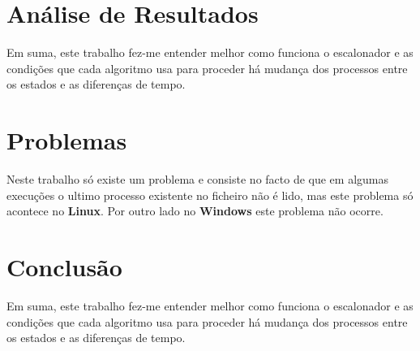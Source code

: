 \documentclass[11pt]{article}   %
\begin{document}
\section{Análise de Resultados} %
Em suma, este trabalho fez-me entender melhor como funciona o escalonador e as condições que cada algoritmo usa para proceder há mudança dos processos entre os estados e as diferenças de tempo. 

\section{Problemas}
\hspace{0,5cm}Neste trabalho só existe um problema e consiste no facto de que em algumas execuções o ultimo processo existente no ficheiro não é lido, mas este problema só acontece no \textbf{Linux}. Por outro lado no \textbf{Windows} este problema não ocorre.
\section{Conclusão} %
Em suma, este trabalho fez-me entender melhor como funciona o escalonador e as condições que cada algoritmo usa para proceder há mudança dos processos entre os estados e as diferenças de tempo. 
\end{document}
